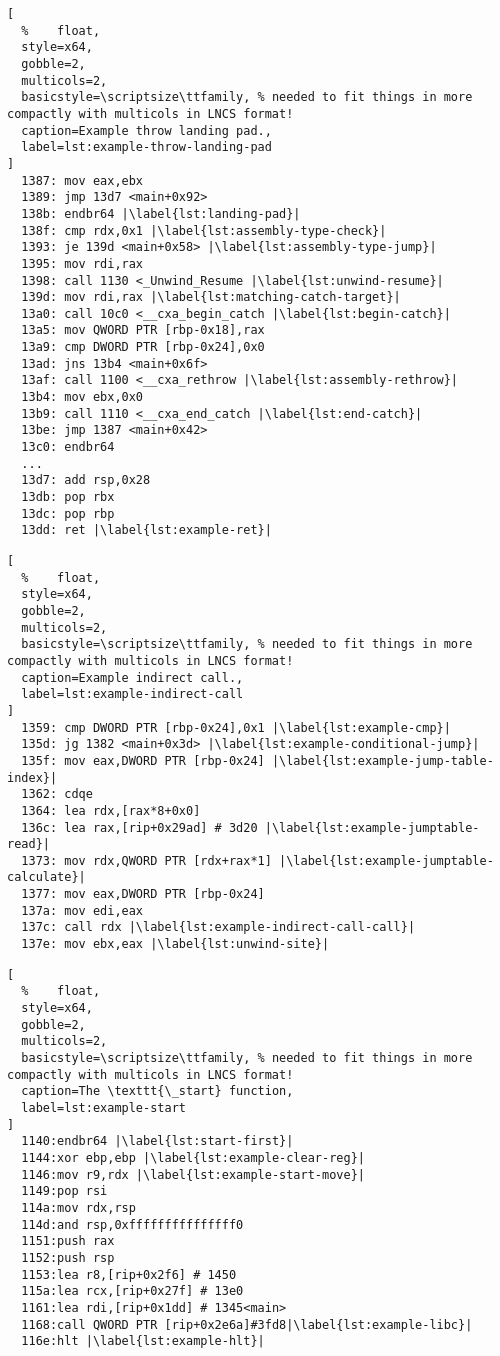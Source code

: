 \begin{lstlisting}[
  %    float,
  style=x64,
  gobble=2,
  multicols=2,
  basicstyle=\scriptsize\ttfamily, % needed to fit things in more compactly with multicols in LNCS format!
  caption=Example throw landing pad.,
  label=lst:example-throw-landing-pad
]
  1387: mov eax,ebx
  1389: jmp 13d7 <main+0x92>
  138b: endbr64 |\label{lst:landing-pad}|
  138f: cmp rdx,0x1 |\label{lst:assembly-type-check}|
  1393: je 139d <main+0x58> |\label{lst:assembly-type-jump}|
  1395: mov rdi,rax
  1398: call 1130 <_Unwind_Resume |\label{lst:unwind-resume}|
  139d: mov rdi,rax |\label{lst:matching-catch-target}|
  13a0: call 10c0 <__cxa_begin_catch |\label{lst:begin-catch}|
  13a5: mov QWORD PTR [rbp-0x18],rax
  13a9: cmp DWORD PTR [rbp-0x24],0x0
  13ad: jns 13b4 <main+0x6f>
  13af: call 1100 <__cxa_rethrow |\label{lst:assembly-rethrow}|
  13b4: mov ebx,0x0
  13b9: call 1110 <__cxa_end_catch |\label{lst:end-catch}|
  13be: jmp 1387 <main+0x42>
  13c0: endbr64
  ...
  13d7: add rsp,0x28
  13db: pop rbx
  13dc: pop rbp
  13dd: ret |\label{lst:example-ret}|
\end{lstlisting}
\begin{lstlisting}[
  %    float,
  style=x64,
  gobble=2,
  multicols=2,
  basicstyle=\scriptsize\ttfamily, % needed to fit things in more compactly with multicols in LNCS format!
  caption=Example indirect call.,
  label=lst:example-indirect-call
]
  1359: cmp DWORD PTR [rbp-0x24],0x1 |\label{lst:example-cmp}|
  135d: jg 1382 <main+0x3d> |\label{lst:example-conditional-jump}|
  135f: mov eax,DWORD PTR [rbp-0x24] |\label{lst:example-jump-table-index}|
  1362: cdqe
  1364: lea rdx,[rax*8+0x0]
  136c: lea rax,[rip+0x29ad] # 3d20 |\label{lst:example-jumptable-read}|
  1373: mov rdx,QWORD PTR [rdx+rax*1] |\label{lst:example-jumptable-calculate}|
  1377: mov eax,DWORD PTR [rbp-0x24]
  137a: mov edi,eax
  137c: call rdx |\label{lst:example-indirect-call-call}|
  137e: mov ebx,eax |\label{lst:unwind-site}|
\end{lstlisting}
\begin{lstlisting}[
  %    float,
  style=x64,
  gobble=2,
  multicols=2,
  basicstyle=\scriptsize\ttfamily, % needed to fit things in more compactly with multicols in LNCS format!
  caption=The \texttt{\_start} function,
  label=lst:example-start
]
  1140:endbr64 |\label{lst:start-first}|
  1144:xor ebp,ebp |\label{lst:example-clear-reg}|
  1146:mov r9,rdx |\label{lst:example-start-move}|
  1149:pop rsi
  114a:mov rdx,rsp
  114d:and rsp,0xfffffffffffffff0
  1151:push rax
  1152:push rsp
  1153:lea r8,[rip+0x2f6] # 1450
  115a:lea rcx,[rip+0x27f] # 13e0
  1161:lea rdi,[rip+0x1dd] # 1345<main>
  1168:call QWORD PTR [rip+0x2e6a]#3fd8|\label{lst:example-libc}|
  116e:hlt |\label{lst:example-hlt}|
\end{lstlisting}
